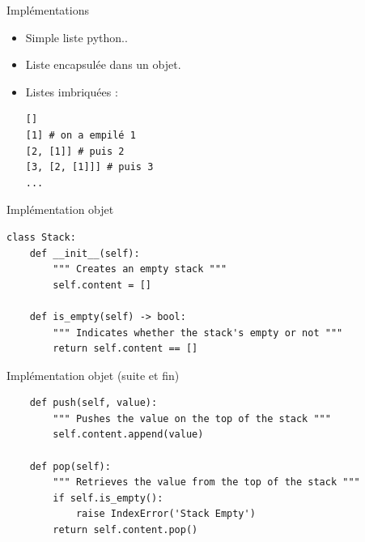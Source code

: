 \documentclass[10pt]{beamer}
\begin{document}
\begin{frame}[fragile]{Implémentations}
	\begin{itemize}
		\item Simple liste python..\pause
		\item Liste encapsulée dans un objet.\pause
		\item Listes imbriquées :\\
\begin{verbatim}
[]
[1] # on a empilé 1
[2, [1]] # puis 2
[3, [2, [1]]] # puis 3
...
\end{verbatim}
	\end{itemize}
\end{frame}
\begin{frame}[fragile]{Implémentation objet}
\begin{verbatim}
class Stack:
    def __init__(self):
        """ Creates an empty stack """
        self.content = []
        
    def is_empty(self) -> bool:
        """ Indicates whether the stack's empty or not """
        return self.content == []
\end{verbatim}
\end{frame}

\begin{frame}[fragile]{Implémentation objet (suite et fin)}
	\begin{verbatim}
    def push(self, value):
        """ Pushes the value on the top of the stack """
        self.content.append(value)

    def pop(self):
        """ Retrieves the value from the top of the stack """
        if self.is_empty():
            raise IndexError('Stack Empty')
        return self.content.pop()
	\end{verbatim}
\end{frame}
\end{document}
